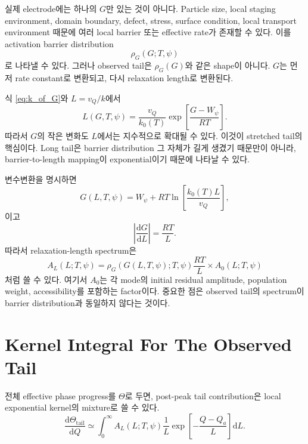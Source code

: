 \documentclass[11pt,a4paper]{article}
\newcommand{\dd}{\mathrm{d}}
\begin{document}
실제 electrode에는 하나의 \(G\)만 있는 것이 아니다. Particle size, local staging environment, domain boundary, defect, stress, surface condition, local transport environment 때문에 여러 local barrier 또는 effective rate가 존재할 수 있다. 이를 activation barrier distribution
\begin{equation}
\rho_G(G;T,\psi)
\end{equation}
로 나타낼 수 있다. 그러나 observed tail은 \(\rho_G(G)\)와 같은 shape이 아니다. \(G\)는 먼저 rate constant로 변환되고, 다시 relaxation length로 변환된다.

식 \eqref{eq:k_of_G}와 \(L=v_Q/k\)에서
\begin{equation}
\boxed{
L(G,T,\psi)
=
\frac{v_Q}{k_0(T)}
\exp\!\left[
\frac{G-W_\psi}{RT}
\right].
}
\label{eq:L_of_G}
\end{equation}
따라서 \(G\)의 작은 변화도 \(L\)에서는 지수적으로 확대될 수 있다. 이것이 stretched tail의 핵심이다. Long tail은 barrier distribution 그 자체가 길게 생겼기 때문만이 아니라, barrier-to-length mapping이 exponential이기 때문에 나타날 수 있다.

변수변환을 명시하면
\begin{equation}
G(L,T,\psi)
=
W_\psi
+
RT\ln\!\left[
\frac{k_0(T)L}{v_Q}
\right],
\label{eq:G_of_L}
\end{equation}
이고
\begin{equation}
\left|\frac{\dd G}{\dd L}\right|
=
\frac{RT}{L}.
\label{eq:jacobian}
\end{equation}
따라서 relaxation-length spectrum은
\begin{equation}
A_L(L;T,\psi)
=
\rho_G(G(L,T,\psi);T,\psi)
\frac{RT}{L}
\times A_0(L;T,\psi)
\label{eq:length_spectrum}
\end{equation}
처럼 쓸 수 있다. 여기서 \(A_0\)는 각 mode의 initial residual amplitude, population weight, accessibility를 포함하는 factor이다. 중요한 점은 observed tail의 spectrum이 barrier distribution과 동일하지 않다는 것이다.

\section{Kernel Integral For The Observed Tail}

전체 effective phase progress를 \(\Theta\)로 두면, post-peak tail contribution은 local exponential kernel의 mixture로 쓸 수 있다.
\begin{equation}
\boxed{
\frac{\dd\Theta_{\mathrm{tail}}}{\dd Q}
\simeq
\int_0^\infty
A_L(L;T,\psi)
\frac{1}{L}
\exp\!\left[-\frac{Q-Q_a}{L}\right]
\dd L .
}
\label{eq:tail_kernel_integral}
\end{equation}
\end{document}
